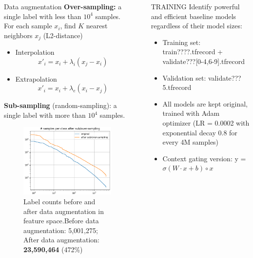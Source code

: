 \documentclass[final]{beamer}
\newlength{\sepwidth}
\newlength{\colwidth}
\newcommand{\separatorcolumn}{\begin{column}{\sepwidth}\end{column}}
\begin{document}
\begin{frame}[t]
\begin{columns}[t]
\begin{column}{\colwidth}
\begin{alertblock}{Data augmentation}
    \textbf{Over-sampling:} a single label with less than $10^4$ samples. For each sample $x_i$, find $K$ nearest neighbors $x_j$ (L2-distance)
    \begin{itemize}
      \item Interpolation
      \begin{equation}
          x'_i = x_i + \lambda_i (x_j - x_i)
      \end{equation}
      \item Extrapolation
      \begin{equation}
          x'_i = x_i + \lambda_e (x_i - x_j)
      \end{equation}
    \end{itemize}
    \textbf{Sub-sampling} (random-sampling): a single label with more than $10^4$ samples.
  \end{alertblock}
  	\begin{figure}
    	\centering
    	\includegraphics[width=0.6\linewidth]{../figures/new_num_samples_per_class_cropped.png}
		\caption{Label counts before and after data augmentation in feature space.Before data augmentation: 5,001,275; After data augmentation: \textbf{23,590,464} (472\%)
}	
    \end{figure}
\end{column}

\separatorcolumn


\begin{column}{\colwidth}
  \begin{block}{TRAINING}
    Identify powerful and efficient baseline models regardless of their model sizes:
  \begin{itemize}
    \item Training set: train????.tfrecord + validate???[0-4,6-9].tfrecord
    \item Validation set: validate???5.tfrecord
    \item All models are kept original, trained with Adam optimizer (LR = 0.0002 with exponential decay 0.8 for every 4M samples)
    \item Context gating version: y = $\sigma (W \cdot x + b) \circ x$
  \end{itemize}


\end{block}
\end{column}
\end{columns}
\end{frame}
\end{document}
